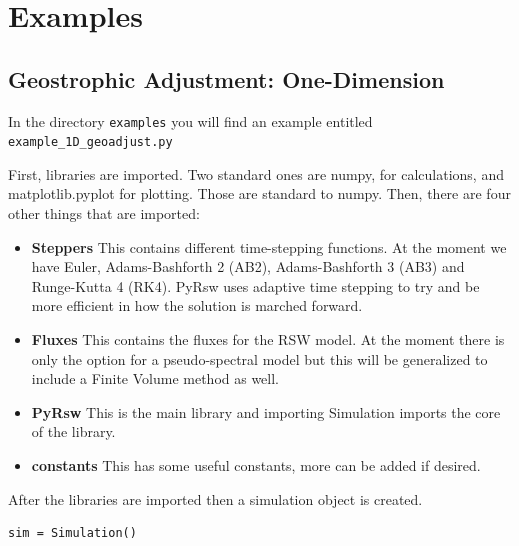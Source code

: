 \documentclass[11pt]{article}
\begin{document}

 



\section*{Examples}

\subsection*{Geostrophic Adjustment: One-Dimension}

In the directory \texttt{examples} you will find an example entitled \texttt{example\_1D\_geoadjust.py}

First, libraries are imported.  Two standard ones are numpy, for calculations, and matplotlib.pyplot for plotting.  Those are standard to numpy.  Then, there are four other things that are imported:
\begin{itemize}
\item {\bf Steppers} This contains different time-stepping functions.  At the moment we have Euler, Adams-Bashforth 2 (AB2), Adams-Bashforth 3 (AB3) and Runge-Kutta 4 (RK4).  PyRsw uses adaptive time stepping to try and be more efficient in how the solution is marched forward.
\item {\bf Fluxes} This contains the fluxes for the RSW model.  At the moment there is only the option for a pseudo-spectral model but this will be generalized to include a Finite Volume method as well.
\item {\bf PyRsw} This is the main library and importing Simulation imports the core of the library.  
\item {\bf constants}  This has some useful constants, more can be added if desired.
\end{itemize}

\noindent After the libraries are imported then a simulation object is created.
\begin{lstlisting}
sim = Simulation()
\end{lstlisting}
\end{document}
